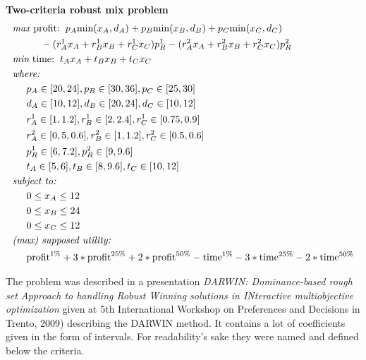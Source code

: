 \begin{description}
  \item{\textbf{Two-criteria robust mix problem}}
    \begin{align*}
      & \textit{max}\text{ profit:} \hspace{0.2cm} p_A \text{min}(x_A, d_A)
      + p_B \text{min}(x_B, d_B) +  p_C \text{min}(x_C, d_C) \\
      & \hspace{1cm} - (r^1_Ax_A + r^1_Bx_B + r^1_Cx_C) p^1_R
      - (r^2_Ax_A + r^2_Bx_B + r^2_Cx_C) p^2_R\\
      & \textit{min}\text{ time:} \hspace{0.2cm} t_Ax_A + t_Bx_B + t_Cx_C \\
      & \textit{where:} \\
      & \hspace{0.5cm} p_A \in [20, 24], p_B \in [30, 36], p_C \in [25, 30] \\
      & \hspace{0.5cm} d_A \in [10, 12], d_B \in [20, 24], d_C \in [10, 12] \\
      & \hspace{0.5cm} r^1_A \in [1, 1.2], r^1_B \in [2, 2.4], r^1_C \in [0.75, 0.9] \\ 
      & \hspace{0.5cm} r^2_A \in [0,5, 0.6], r^2_B \in [1, 1.2], r^2_C \in [0.5, 0.6] \\ 
      & \hspace{0.5cm} p^1_R \in [6, 7.2], p^2_R \in [9, 9.6] \\
      & \hspace{0.5cm} t_A \in [5, 6], t_B \in [8, 9.6], t_C \in [10, 12] \\ 
      & \textit{subject to:} \\
      & \hspace{0.5cm} 0 \le x_A \le 12 \\
      & \hspace{0.5cm} 0 \le x_B \le 24 \\
      & \hspace{0.5cm} 0 \le x_C \le 12 \\
      & \textit{(max) supposed utility:} \\
      & \hspace{0.5cm} \text{profit}^{1\%} + 3 * \text{profit}^{25\%}
      + 2 * \text{profit}^{50\%} - \text{time}^{1\%}
      - 3 * \text{time}^{25\%} - 2 * \text{time}^{50\%} 
    \end{align*}
    
    
    The problem was described in a presentation \textit{DARWIN:
      Dominance-based rough set Approach to handling Robust Winning solutions
      in INteractive multiobjective optimization} given at 5th International
    Workshop on Preferences and Decisions in Trento, 2009) describing the
    DARWIN method. It contains a lot of coefficients given in the form of
    intervals. For readability's sake they were named and defined below the
    criteria.


\end{description}

